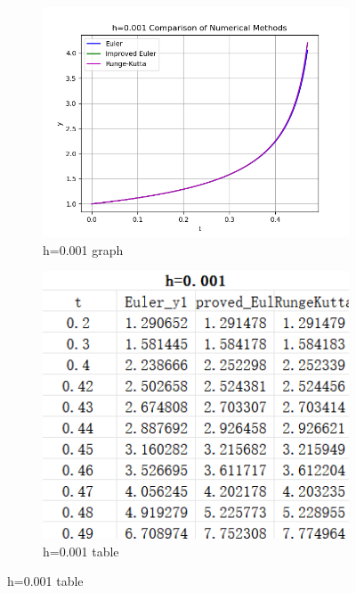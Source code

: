 \documentclass{article}
\begin{document}
\begin{figure}[htb] %
    \centering %

    \begin{subfigure}[b]{0.45\linewidth} %
        \centering
        \includegraphics[width=\linewidth]{pic/comp_0.001_fig.png} %
        \caption{h=0.001 graph} %
        \label{fig:kutta-1} %
    \end{subfigure}
    \hfill %
    \begin{subfigure}[b]{0.45\linewidth}
        \centering
        \includegraphics[width=\linewidth]{pic/comp0.001table.png}
        \caption{h=0.001 table} %
        \label{fig:kutta0} %
    \end{subfigure}
    \hfill %
\end{figure}
\end{document}
